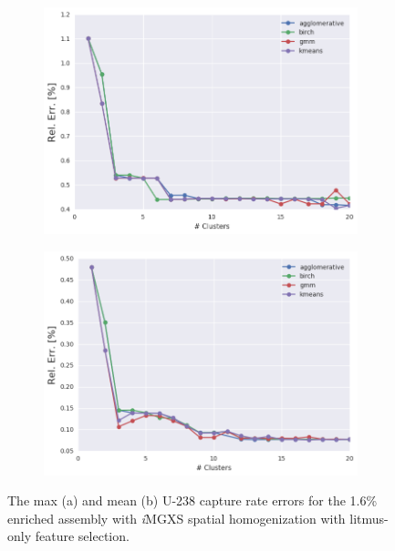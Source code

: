 \begin{figure}[h!]
\centering
\begin{subfigure}{0.9\textwidth}
  \centering
  \includegraphics[width=\linewidth]{figures/results/err-by-cluster/assm-16/max-rel-err}
  \caption{}
  \label{fig:chap11-max-capt-err-by-cluster-assm-16}
\end{subfigure}
\begin{subfigure}{0.9\textwidth}
  \centering
  \includegraphics[width=\linewidth]{figures/results/err-by-cluster/assm-16/mean-rel-err}
  \caption{}
  \label{fig:chap11-mean-capt-err-by-cluster-assm-16}
\end{subfigure}
\caption[U-238 capture rate errors for the 1.6\% enriched assembly]{The max (a) and mean (b) U-238 capture rate errors for the 1.6\% enriched assembly with \textit{i}\ac{MGXS} spatial homogenization with litmus-only feature selection.}
\label{fig:chap11-capt-err-by-cluster-assm-16}
\end{figure}

